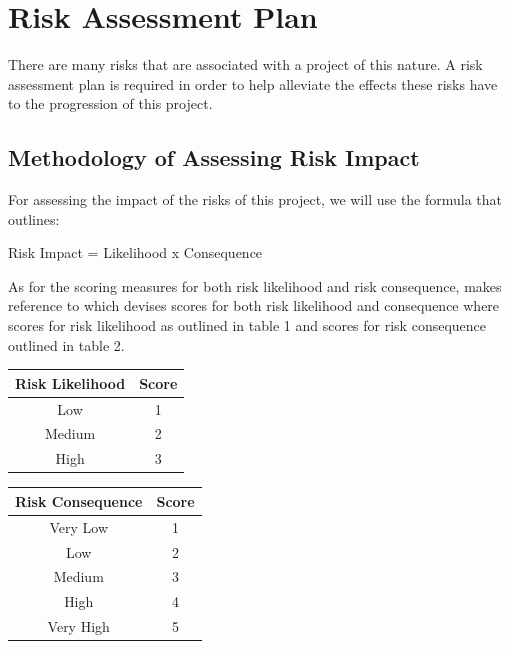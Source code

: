 \documentclass{article}
\begin{document}
\section{Risk Assessment Plan}
There are many risks that are associated with a project of this nature. A risk assessment plan is required in order to help alleviate the effects these risks have to the progression of this project.
\subsection{Methodology of Assessing Risk Impact}
For assessing the impact of the risks of this project, we will use the formula that \textcite[][84]{dawson15} outlines: 
\begin{center}
Risk Impact = Likelihood x Consequence
\end{center}
As for the scoring measures for both risk likelihood and risk consequence, \textcite[][85]{dawson15} makes reference to \textcite[][256]{turner93} which devises scores for both risk likelihood and consequence where scores for risk likelihood as outlined in table 1 and scores for risk consequence outlined in table 2.
\par
\begin{multicols}{2}
    \begin{center}
    \vspace{0.1cm}
        \centering
        \begin{tabular}{|c|c|} \hline
        Risk Likelihood & Score \tabularnewline
        \hline
        Low & 1 \\ \hline
        Medium & 2 \\ \hline
        High & 3 \\ \hline
        \end{tabular}
    \end{center}
    \begin{center}
    \vspace{0.1cm}
        \centering
        \begin{tabular}{|c|c|} \hline
        Risk Consequence & Score \tabularnewline
        \hline
        Very Low & 1 \\ \hline
        Low & 2 \\ \hline
        Medium & 3 \\ \hline
        High & 4 \\ \hline
        Very High & 5 \\ \hline
        \end{tabular}
    \end{center}
\end{multicols}
\par
\end{document}
